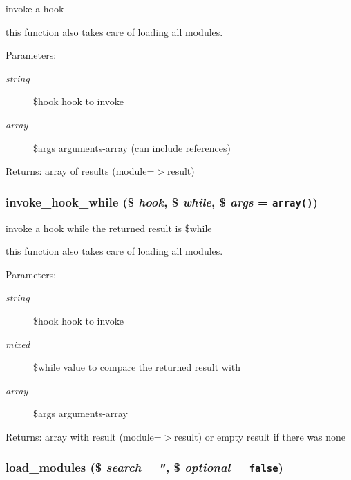 invoke a hook

this function also takes care of loading all modules. \begin{Desc}
\item[Parameters:]
\begin{description}
\item[{\em string}]\$hook hook to invoke \item[{\em array}]\$args arguments-array (can include references) \end{description}
\end{Desc}
\begin{Desc}
\item[Returns:]array of results (module=$>$result) \end{Desc}
\hypertarget{modules_8inc_8php_66473fc9f24153d85053f1f9c6ed83e4}{
\subsubsection[{invoke\_\-hook\_\-while}]{\setlength{\rightskip}{0pt plus 5cm}invoke\_\-hook\_\-while (\$ {\em hook}, \/  \$ {\em while}, \/  \$ {\em args} = {\tt array()})}}
\label{modules_8inc_8php_66473fc9f24153d85053f1f9c6ed83e4}


invoke a hook while the returned result is \$while

this function also takes care of loading all modules. \begin{Desc}
\item[Parameters:]
\begin{description}
\item[{\em string}]\$hook hook to invoke \item[{\em mixed}]\$while value to compare the returned result with \item[{\em array}]\$args arguments-array \end{description}
\end{Desc}
\begin{Desc}
\item[Returns:]array with result (module=$>$result) or empty result if there was none \end{Desc}
\hypertarget{modules_8inc_8php_23f8be02dc2148a3c860119a1d6ea276}{
\subsubsection[{load\_\-modules}]{\setlength{\rightskip}{0pt plus 5cm}load\_\-modules (\$ {\em search} = {\tt ''}, \/  \$ {\em optional} = {\tt false})}}
\label{modules_8inc_8php_23f8be02dc2148a3c860119a1d6ea276}


